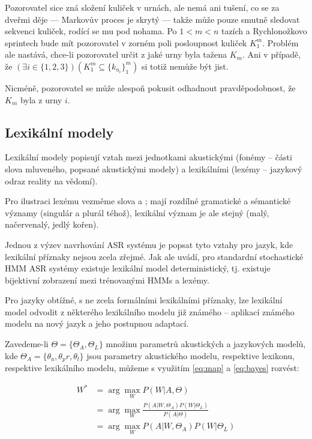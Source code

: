 Pozorovatel sice zná složení kuliček v urnách, ale nemá ani tušení, co se za dveřmi děje --- Markovův proces je skrytý --- takže může pouze smutně sledovat sekvenci kuliček, rodící se mu pod nohama. Po $1<m<n$ tazích a Rychlonožkovo sprintech bude mít pozorovatel v zorném poli posloupnost kuliček $K_1^m$. Problém ale nastává, chce-li pozorovatel určit z jaké urny byla tažena $K_m$. Ani v případě, že $(\exists i \in \{1, 2, 3\})(K_1^m \subseteq \{k_{u_i}\}_1^m)$ si totiž nemůže být jist.

Nicméně, pozorovatel se může alespoň pokusit odhadnout pravděpodobnost, že $K_m$ byla z urny $i$.

\subsection{Lexikální modely}

Lexikální modely popisují vztah mezi jednotkami akustickými (fonémy -- části slova mluveného, popsané akustickými modely) a lexikálními (lexémy -- jazykový odraz reality na vědomí). 

Pro ilustraci lexému vezměme slova  a ; mají rozdílné gramatické a sémantické významy (singulár a plurál téhož), lexikální význam je ale stejný (malý, načervenalý, jedlý kořen). 

Jednou z výzev navrhování ASR systému je popsat tyto vztahy pro jazyk, kde lexikální příznaky nejsou zcela zřejmé. Jak ale \cite{rasipuram_2014} uvádí, pro standardní stochastické HMM ASR systémy existuje lexikální model deterministický, tj. existuje bijektivní zobrazení mezi trénovanými HMMs a lexémy.

Pro jazyky obtížné, s ne zcela formálními lexikálními příznaky, lze lexikální model odvodit z některého lexikálního modelu již známého -- aplikací známého modelu na nový jazyk a jeho postupnou adaptací.

Zavedeme-li $\Theta = \{\Theta_A, \Theta_L\}$ množinu parametrů akustických a jazykových modelů, kde $\Theta_A = \{\theta_a, \theta_pr, \theta_l\}$ jsou parametry akustického modelu, respektive lexikonu, respektive lexikálního modelu, můžeme s využitím \ref{eq:map} a \ref{eq:bayes} rozvést:

\begin{align}
	\label{eq:lm}
	W^* &= \arg \max_W P(W|A, \Theta)\\
	    &= \arg \max_W \frac{P(A|W, \Theta_A)P(W|\Theta_L)}{P(A|\Theta)}\\
	    &= \arg \max_W P(A|W, \Theta_A)P(W|\Theta_L)
\end{align}

